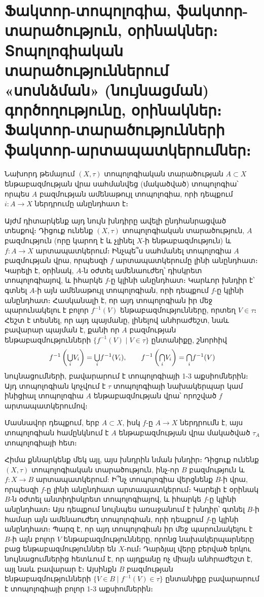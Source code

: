 \documentclass[./main.tex]{subfiles}
\begin{document}
\onehalfspacing
\section{Ֆակտոր-տոպոլոգիա, ֆակտոր-տարածություն, օրինակներ։ Տոպո\-լո\-գիա\-կան տարածություններում «սոսնձման» (նույնացման) գործո\-ղու\-թյու\-նը, օրինակներ։ Ֆակտոր-տարածությունների ֆակտոր-արտա\-պատ\-կե\-րում\-ներ։}\label{sec:12}

\par Նախորդ թեմայում $(X,\tau)$ տոպոլոգիական տարածության $A \subset X$ ենթաբազ\-մու\-թ\-յան վրա սահմանվեց (մակածված) տոպոլոգիա՝ որպես $A$ բազմության ամենա\-թույլ տո\-պո\-լո\-գիա, որի դեպքում $i:A \to X$ ներդրումը անընդհատ է։

\par Այժմ դիտարկենք այդ նույն խնդիրը ավելի ընդհանրացված տեսքով։ Դիցուք ունենք $(X,\tau)$ տոպոլոգիական տարածություն, $A$ բազմություն (որը կարող է և չլինել $X\textrm{-ի}$ ենթաբազմություն) և $f:A\to X$ արտապատկերում։ Ինչպե՞ս սահմանել տո\-պո\-լո\-գիա $A$ բազմության վրա, որպեսզի $f$ արտապատկերումը լինի անընդհատ։ Կարելի է, օրինակ, $A$-ն օժտել ամենաուժեղ՝ դիսկրետ տոպոլոգիայով, և իհարկե $f$-ը կլինի անընդհատ։ Կարևոր խնդիր է՝ գտնել $A$-ի այն ամենաթույլ տո\-պո\-լո\-գիան, որի դեպքում $f$-ը կլինի անընդհատ։ Հասկանալի է, որ այդ տոպոլոգիան իր մեջ պարունակելու է բոլոր $f^{-1} (V)$ ենթաբազմությունները, որտեղ $V\in\tau$։ Հեշտ է տես\-նել, որ այդ պայմանը, լինելով անհրաժեշտ, նաև բավարար պայման է, քանի որ $A$ բազ\-մու\-թյան ենթաբազմությունների $\{f^{-1}(V)\mid V\in\tau\}$ ընտանիքը, շնորհիվ
\[
f^{-1}\left(\mathsmaller{\bigcup}\limits_{i} V_i\right) = \mathsmaller{\bigcup}\limits_{i} f^{-1}(V_i), \qquad f^{-1}\left(\mathsmaller{\bigcap}\limits_{i} V_i\right) = \mathsmaller{\bigcap}\limits_{i} f^{-1}(V)
\]
նույնացումների, բավարարում է տոպոլոգիայի 1-3 աքսիոմներին։ Այդ տոպոլոգիան կոչվում է $\tau$ տոպոլոգիայի նախակերպար կամ ինիցիալ տոպոլոգիա $A$ ենթա\-բազ\-մու\-թյան վրա՝ որոշված $f$ արտապատկերումով։

\par Մասնավոր դեպքում, երբ $A\subset X$, իսկ $f$-ը $A\to X$ ներդրումն է, այս տոպոլոգիան համընկնում է $A$ ենթաբազմության վրա մակածված $\tau_A$ տոպոլոգիայի հետ։ 

\par Հիմա քննարկենք մեկ այլ, այս խնդրին նման խնդիր։ Դիցուք ունենք $(X,\tau)$ տո\-պո\-լոգիական տարածություն, ինչ-որ $B$ բազմություն և $f:X\to B$ արտապատ\-կե\-րում: Ի՞նչ տոպոլոգիա վերցնենք $B$-ի վրա, որպեսզի $f$-ը լինի անընդհատ արտա\-պատ\-կե\-րում։ Կարելի է օրինակ $B$-ն օժտել անտիդիսկրետ տոպոլոգիայով, և իհարկե $f$-ը կլինի ան\-ընդհատ։ Այս դեպքում նույնպես առաջանում է խնդիր՝ գտնել $B$-ի համար այն ա\-մե\-նա\-ու\-ժեղ տոպոլոգիան, որի դեպքում $f$-ը կլինի անընդհատ։ Պարզ է, որ այդ տոպոլոգիան իր մեջ պարունակելու է $B$-ի այն բոլոր $V$ ենթաբազ\-մու\-թյուն\-նե\-րը, որոնց նախակերպարները բաց ենթաբազմություններ են $X$-ում։ Դարձյալ վերը բեր\-ված երկու նույնացումներից հետևում է, որ այդքանը ոչ միայն անհրա\-ժեշտ է, այլ նաև բավարար է։ Այսինքն $B$ բազմության ենթաբազմությունների $\{V\in B\mid f^{-1} (V)\in \tau\}$ ընտանիքը բավարարում է տոպոլոգիայի բոլոր 1-3 աքսիոմներին։
\end{document}
